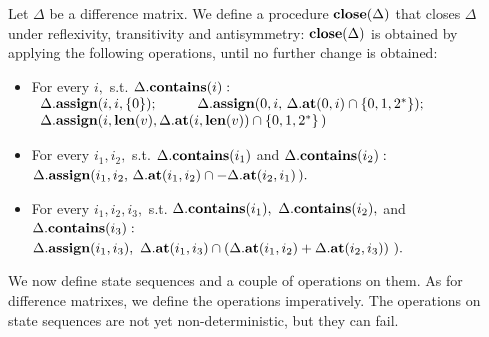 \begin{definition}
   Let $ \Delta $ be a difference matrix. We define
   a procedure $ {\bf close}( \Delta ) $ that
   closes $ \Delta $ under reflexivity, transitivity and antisymmetry:
   $ {\bf close}( \Delta ) $
   is obtained by applying the following
   operations, until no further change is obtained:
   \begin{itemize}
   \item
      For every $ i, $ s.t. $ \Delta. {\bf contains}(i): $ \\
      \hspace*{1.0cm} $ 
         \begin{array}{l}
            \Delta. {\bf assign}(i,i, \{ 0 \} ); \hspace*{1.0cm}
            \Delta. {\bf assign}( 0, i, \,
               \Delta. {\bf at}(0,i) \cap \{ 0,1,2^{*} \} ); \\ 
            \Delta. {\bf assign}( i, {\bf len}(v),
               \Delta. {\bf at}( i, {\bf len}(v)) \cap \{ 0,1,2^{*} \} \, ) \\
         \end{array}
      $ 
   \item
      For every $ i_1,i_2, $ s.t. $ \Delta. {\bf contains}(i_1) $ and
      $ \Delta. {\bf contains}(i_2): $ \\
      \hspace*{1.0cm}
      $ 
           \Delta. {\bf assign}(i_1,i_2, \,
           \Delta. {\bf at}(i_1,i_2) \cap -\Delta. {\bf at}(i_2,i_1) \, ). 
      $
   \item
      For every $ i_1,i_2,i_3, $ s.t. $ \Delta. {\bf contains}(i_1), \
      \Delta. {\bf contains}(i_2), $ and $ \Delta. {\bf contains}(i_3): $ \\
      \hspace*{1.0cm} 
      $ \Delta.{\bf assign}(i_1,i_3), \
           \Delta. {\bf at}(i_1,i_3) \cap (
           \Delta. {\bf at}(i_1,i_2) + \Delta. {\bf at}(i_2,i_3)) \ ). $ 
   \end{itemize}
\end{definition}
We now define state sequences and a couple of operations
on them.
As for difference matrixes, we define the operations imperatively.
The operations on state sequences are not yet non-deterministic,
but they can fail.
